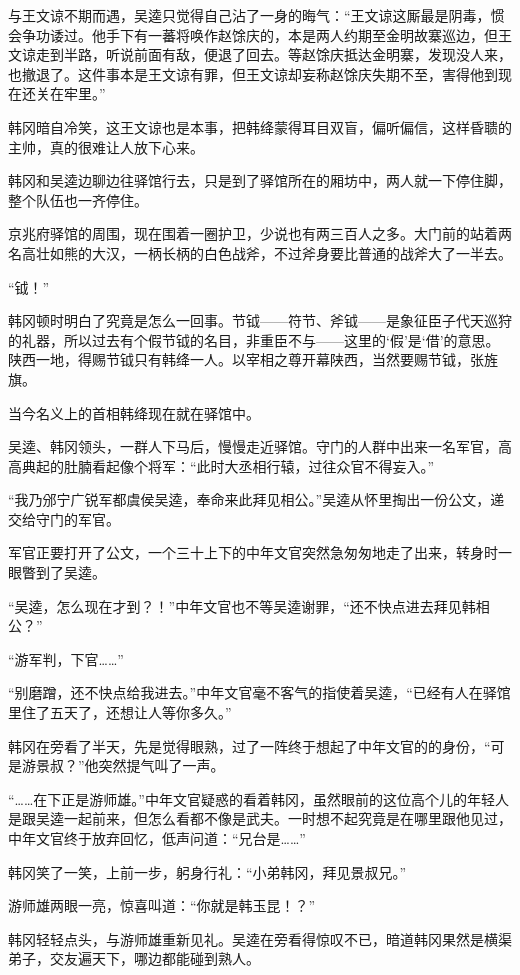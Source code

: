 与王文谅不期而遇，吴逵只觉得自己沾了一身的晦气：“王文谅这厮最是阴毒，惯会争功诿过。他手下有一蕃将唤作赵馀庆的，本是两人约期至金明故寨巡边，但王文谅走到半路，听说前面有敌，便退了回去。等赵馀庆抵达金明寨，发现没人来，也撤退了。这件事本是王文谅有罪，但王文谅却妄称赵馀庆失期不至，害得他到现在还关在牢里。”

韩冈暗自冷笑，这王文谅也是本事，把韩绛蒙得耳目双盲，偏听偏信，这样昏聩的主帅，真的很难让人放下心来。

韩冈和吴逵边聊边往驿馆行去，只是到了驿馆所在的厢坊中，两人就一下停住脚，整个队伍也一齐停住。

京兆府驿馆的周围，现在围着一圈护卫，少说也有两三百人之多。大门前的站着两名高壮如熊的大汉，一柄长柄的白色战斧，不过斧身要比普通的战斧大了一半去。

“钺！”

韩冈顿时明白了究竟是怎么一回事。节钺——符节、斧钺——是象征臣子代天巡狩的礼器，所以过去有个假节钺的名目，非重臣不与——这里的‘假’是‘借’的意思。陕西一地，得赐节钺只有韩绛一人。以宰相之尊开幕陕西，当然要赐节钺，张旌旗。

当今名义上的首相韩绛现在就在驿馆中。

吴逵、韩冈领头，一群人下马后，慢慢走近驿馆。守门的人群中出来一名军官，高高典起的肚腩看起像个将军：“此时大丞相行辕，过往众官不得妄入。”

“我乃邠宁广锐军都虞侯吴逵，奉命来此拜见相公。”吴逵从怀里掏出一份公文，递交给守门的军官。

军官正要打开了公文，一个三十上下的中年文官突然急匆匆地走了出来，转身时一眼瞥到了吴逵。

“吴逵，怎么现在才到？！”中年文官也不等吴逵谢罪，“还不快点进去拜见韩相公？”

“游军判，下官……”

“别磨蹭，还不快点给我进去。”中年文官毫不客气的指使着吴逵，“已经有人在驿馆里住了五天了，还想让人等你多久。”

韩冈在旁看了半天，先是觉得眼熟，过了一阵终于想起了中年文官的的身份，“可是游景叔？”他突然提气叫了一声。

“……在下正是游师雄。”中年文官疑惑的看着韩冈，虽然眼前的这位高个儿的年轻人是跟吴逵一起前来，但怎么看都不像是武夫。一时想不起究竟是在哪里跟他见过，中年文官终于放弃回忆，低声问道：“兄台是……”

韩冈笑了一笑，上前一步，躬身行礼：“小弟韩冈，拜见景叔兄。”

游师雄两眼一亮，惊喜叫道：“你就是韩玉昆！？”

韩冈轻轻点头，与游师雄重新见礼。吴逵在旁看得惊叹不已，暗道韩冈果然是横渠弟子，交友遍天下，哪边都能碰到熟人。

